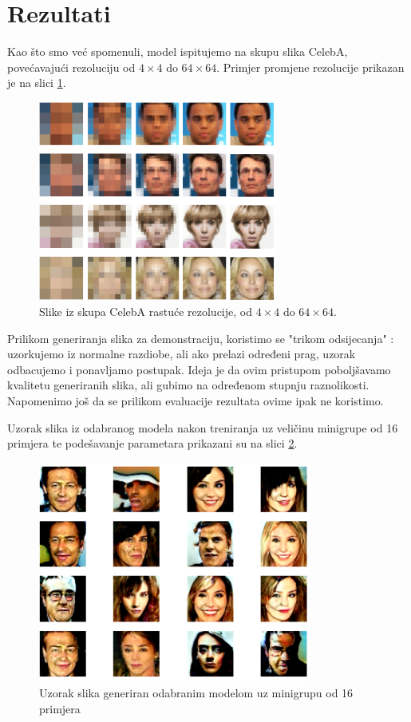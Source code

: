 \section{Rezultati}
Kao što smo već spomenuli, model ispitujemo na skupu slika CelebA, povećavajući rezoluciju od $4 \times 4$ do $64 \times 64$. Primjer promjene rezolucije prikazan je na slici \ref{gt_resolutions}.

\begin{figure}[h]
\centering
		\includegraphics[width=0.7\textwidth]{images/ground_truth/gt_resolutions.png}
\caption{Slike iz skupa CelebA rastuće rezolucije, od $4 \times 4$ do $64 \times 64$.}
\label{gt_resolutions}
\end{figure}

Prilikom generiranja slika za demonstraciju, koristimo se "trikom odsijecanja" : uzorkujemo iz normalne razdiobe, ali ako prelazi određeni prag, uzorak odbacujemo i ponavljamo postupak. Ideja je da ovim pristupom poboljšavamo kvalitetu generiranih slika, ali gubimo na određenom stupnju raznolikosti. Napomenimo još da se prilikom evaluacije rezultata ovime ipak ne koristimo.

Uzorak slika iz odabranog modela nakon treniranja uz veličinu minigrupe od 16 primjera te podešavanje parametara prikazani su na slici \ref{generated_16bs_fine_tune}.

\begin{figure}[h]
\centering
		\includegraphics[width=0.8\textwidth]{images/generated/16bs_best_fid.png}
\caption{Uzorak slika generiran odabranim modelom uz minigrupu od 16 primjera}
\label{generated_16bs_fine_tune}
\end{figure}

